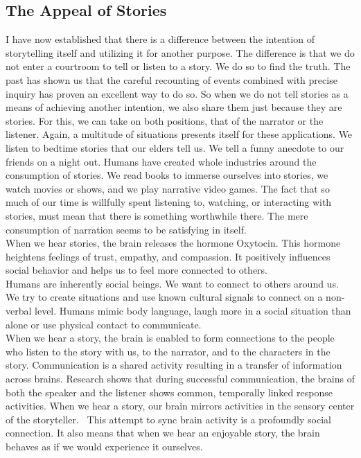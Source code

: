 \subsection{The Appeal of Stories}
I have now established that there is a difference between the intention of storytelling itself and utilizing it for another purpose. The difference is that we do not enter a courtroom to tell or listen to a story. We do so to find the truth. The past has shown us that the careful recounting of events combined with precise inquiry has proven an excellent way to do so. So when we do not tell stories as a means of achieving another intention, we also share them just because they are stories. For this, we can take on both positions, that of the narrator or the listener. Again, a multitude of situations presents itself for these applications. We listen to bedtime stories that our elders tell us. We tell a funny anecdote to our friends on a night out. Humans have created whole industries around the consumption of stories. We read books to immerse ourselves into stories, we watch movies or shows, and we play narrative video games. The fact that so much of our time is willfully spent listening to, watching, or interacting with stories, must mean that there is something worthwhile there. The mere consumption of narration seems to be satisfying in itself.\\
When we hear stories, the brain releases the hormone Oxytocin. This hormone heightens feelings of trust, empathy, and compassion. It positively influences social behavior and helps us to feel more connected to others.~\cite{Gottschall2012}\\
Humans are inherently social beings. We want to connect to others around us. We try to create situations and use known cultural signals to connect on a non-verbal level. Humans mimic body language, laugh more in a social situation than alone or use physical contact to communicate.~\cite{Frith2007}\\
When we hear a story, the brain is enabled to form connections to the people who listen to the story with us, to the narrator, and to the characters in the story. Communication is a shared activity resulting in a transfer of information across brains. Research shows that during successful communication, the brains of both the speaker and the listener shows common, temporally linked response activities. When we hear a story, our brain mirrors activities in the sensory center of the storyteller.~\cite{Stephens2010} This attempt to sync brain activity is a profoundly social connection. It also means that when we hear an enjoyable story, the brain behaves as if we would experience it ourselves.

